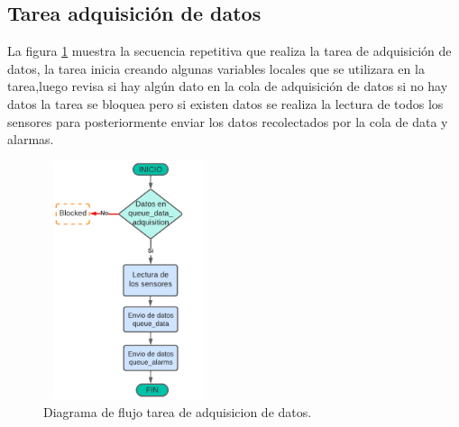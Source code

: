 \subsection{Tarea adquisición de datos} 
La figura \ref{fig:Df tarea adquisicion} muestra la secuencia repetitiva que realiza la tarea de adquisición de datos, la tarea inicia creando algunas variables locales que se utilizara en la tarea,luego revisa si hay algún dato en la cola de adquisición de datos si no hay datos la tarea se bloquea pero si existen datos se realiza la lectura de todos los sensores para posteriormente enviar los datos recolectados por la cola de data y alarmas.

\begin{figure}[h]
  \centering
	\includegraphics[width=5cm, height=7cm]{./Figures/DF task adquisicion.png}
	\caption{Diagrama de flujo tarea de adquisicion de datos.}
	\label{fig:Df tarea adquisicion}
\end{figure}

